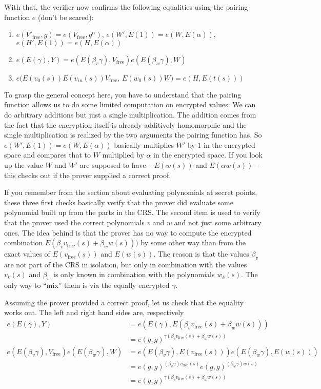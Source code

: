 \documentclass[11pt,letterpaper]{article}
\begin{document}
With that, the verifier now confirms the following equalities using the pairing function $e$ (don't be scared):
\begin{enumerate}
\item $e(V'_\mathrm{free}, g) = e(V_\mathrm{free}, g^{\alpha })$, \quad    $ e(W', E(1)) = e(W, E(\alpha ))$, \quad   $  e(H', E(1)) = e(H, E(\alpha ))$
\item $e(E(\gamma ), Y) = e(E(\beta _{v} \gamma ),  V_\mathrm{free}) e(E(\beta _{w} \gamma ), W)$
\item $e\Big(E(v_{0}(s)) E(v_{in}(s)) V_\mathrm{free},\, E(w_{0}(s)) W\Big) = e(H,   E(t(s)))$
\end{enumerate}


To grasp the general concept here, you have to understand that the pairing function allows us to do some limited computation on encrypted values: We can do arbitrary additions but just a single multiplication. The addition comes from the fact that the encryption itself is already additively homomorphic and the single multiplication is realized by the two arguments the pairing function has. So $e(W', E(1)) = e(W, E(\alpha ))$ basically multiplies $W'$ by $1$ in the encrypted space and compares that to $W$ multiplied by $\alpha$  in the encrypted space. If you look up the value $W$ and $W'$ are supposed to have -- $E(w(s))$ and $E(\alpha  w(s))$ -- this checks out if the prover supplied a correct proof.


If you remember from the section about evaluating polynomials at secret points, these three first checks basically verify that the prover did evaluate some polynomial built up from the parts in the CRS. The second item is used to verify that the prover used the correct polynomials $v$ and $w$ and not just some arbitrary ones. The idea behind is that the prover has no way to compute the encrypted combination $E(\beta _{v} v_\mathrm{free}(s) + \beta _{w} w(s)))$ by some other way than from the exact values of $E(v_\mathrm{free}(s))$ and $E(w(s))$. The reason is that the values $\beta _{v}$ are not part of the CRS in isolation, but only in combination with the values $v_{k}(s)$ and $\beta _{w}$ is only known in combination with the polynomials $w_{k}(s)$. The only way to ``mix'' them is via the equally encrypted $\gamma$.


Assuming the prover provided a correct proof, let us check that the equality works out. The left and right hand sides are, respectively
\begin{align*}
e(E(\gamma ), Y) &= e(E(\gamma ), E(\beta _{v} v_\mathrm{free}(s) + \beta _{w} w(s)))\\ &= e(g, g)^{\gamma (\beta _{v} v_\mathrm{free}(s) + \beta _{w} w(s))} \\
e(E(\beta _{v} \gamma ), V_\mathrm{free}) e(E(\beta _{w} \gamma ), W) &= e(E(\beta _{v} \gamma ), E(v_\mathrm{free}(s))) e(E(\beta _{w} \gamma ), E(w(s)))\\ &= e(g, g)^{(\beta _{v} \gamma ) v_\mathrm{free}(s)} e(g, g)^{(\beta _{w} \gamma ) w(s)}\\ &= e(g, g)^{\gamma (\beta _{v} v_\mathrm{free}(s) + \beta _{w} w(s))}
\end{align*}
\end{document}
